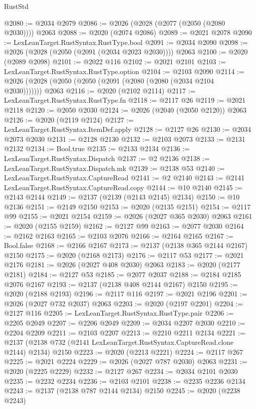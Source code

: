 \begin{lexlean}{RustStd}
\begin{coremodule}
@2080 := @2034 @2079
@2086 := @2026 (@2028 (@2077 (@2050 (@2080 @2030)))) @2063
@2088 := @2020 (@2074 @2086)
@2089 := @2021 @2078
@2090 := LexLeanTarget.RustSyntax.RustType.bool
@2091 := @2034 @2090
@2098 := @2026 (@2028 (@2050 (@2091 (@2034 @2023 @2030)))) @2063
@2100 := @2020 (@2089 @2098)
@2101 := @2022 @116
@2102 := @2021 @2101
@2103 := LexLeanTarget.RustSyntax.RustType.option
@2104 := @2103 @2090
@2114 := @2026 (@2028 (@2050 (@2050 (@2091 (@2080 (@2080 (@2034 @2104 @2030))))))) @2063
@2116 := @2020 (@2102 @2114)
@2117 := LexLeanTarget.RustSyntax.RustType.fn
@2118 := @2117 @26
@2119 := @2021 @2118
@2120 := @2050 @2030
@2124 := @2026 (@2040 (@2050 @2120)) @2063
@2126 := @2020 (@2119 @2124)
@2127 := LexLeanTarget.RustSyntax.ItemDef.apply
@2128 := @2127 @26
@2130 := @2034 @2073 @2030
@2131 := @2128 @2130
@2132 := @2103 @2073
@2133 := @2131 @2132
@2134 := Bool.true
@2135 := @2133 @2134
@2136 := LexLeanTarget.RustSyntax.Dispatch
@2137 := @2 @2136
@2138 := LexLeanTarget.RustSyntax.Dispatch.mk
@2139 := @2138 @53
@2140 := LexLeanTarget.RustSyntax.CaptureRead
@2141 := @2 @2140
@2143 := @2141 LexLeanTarget.RustSyntax.CaptureRead.copy
@2144 := @10 @2140
@2145 := @2143 @2144
@2149 := @2137 (@2139 (@2143 @2145) @2134)
@2150 := @10 @2136
@2151 := @2149 @2150
@2153 := @2020 (@2135 @2151)
@2154 := @2117 @99
@2155 := @2021 @2154
@2159 := @2026 (@2027 @365 @2030) @2063
@2161 := @2020 (@2155 @2159)
@2162 := @2127 @99
@2163 := @2077 @2030
@2164 := @2162 @2163
@2165 := @2103 @2076
@2166 := @2164 @2165
@2167 := Bool.false
@2168 := @2166 @2167
@2173 := @2137 (@2138 @365 @2144 @2167) @2150
@2175 := @2020 (@2168 @2173)
@2176 := @2117 @53
@2177 := @2021 @2176
@2181 := @2026 (@2027 @408 @2030) @2063
@2183 := @2020 (@2177 @2181)
@2184 := @2127 @53
@2185 := @2077 @2037
@2188 := @2184 @2185 @2076 @2167
@2193 := @2137 (@2138 @408 @2144 @2167) @2150
@2195 := @2020 (@2188 @2193)
@2196 := @2117 @116
@2197 := @2021 @2196
@2201 := @2026 (@2027 @732 @2037) @2063
@2203 := @2020 (@2197 @2201)
@2204 := @2127 @116
@2205 := LexLeanTarget.RustSyntax.RustType.pair
@2206 := @2205 @2049
@2207 := @2206 @2049
@2209 := @2034 @2207 @2030
@2210 := @2204 @2209
@2211 := @2103 @2207
@2213 := @2210 @2211 @2134
@2221 := @2137 (@2138 @732 (@2141 LexLeanTarget.RustSyntax.CaptureRead.clone @2144) @2134) @2150
@2223 := @2020 (@2213 @2221)
@2224 := @2117 @267
@2225 := @2021 @2224
@2229 := @2026 (@2027 @787 @2030) @2063
@2231 := @2020 (@2225 @2229)
@2232 := @2127 @267
@2234 := @2034 @2101 @2030
@2235 := @2232 @2234
@2236 := @2103 @2101
@2238 := @2235 @2236 @2134
@2243 := @2137 (@2138 @787 @2144 @2134) @2150
@2245 := @2020 (@2238 @2243)

\end{coremodule}
\end{lexlean}
